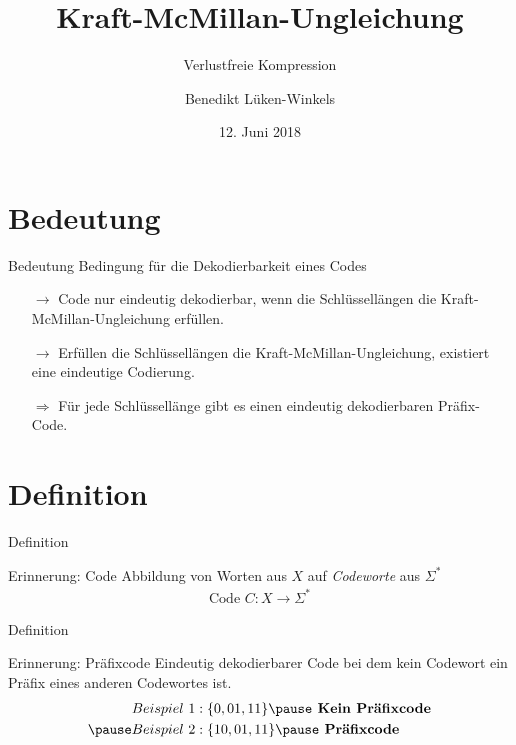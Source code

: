 \documentclass{beamer}
\title{Kraft-McMillan-Ungleichung}
\subtitle{Verlustfreie Kompression}
\date{12. Juni 2018}
\author{Benedikt L{\"u}ken-Winkels}
\institute{Universit{\"a}t Trier}
\begin{document}
\nocite{*}
\maketitle
\section{Bedeutung}
\begin{frame}{Bedeutung}
Bedingung für die Dekodierbarkeit eines Codes\pause
\begin{itemize}
\item[ $\rightarrow$] Code nur eindeutig dekodierbar, wenn die Schlüssellängen die Kraft-McMillan-Ungleichung erfüllen.\pause
\item[$\rightarrow$] Erfüllen die Schlüssellängen die Kraft-McMillan-Ungleichung, existiert eine eindeutige Codierung.\pause
\item[$\Rightarrow$] Für jede Schlüssellänge gibt es einen eindeutig dekodierbaren Präfix-Code.
\end{itemize}

\end{frame}

\section{Definition}
\begin{frame}{Definition}

\begin{center}
\begin{minipage}{.65\textwidth}
\begin{block}{Erinnerung: Code}
Abbildung von Worten aus $X$ auf \textit{Codeworte} aus $\Sigma^{*}$ \pause
\begin{align*}
\text{Code } C:X \rightarrow \Sigma^{*}
\end{align*}
\end{block}
\end{minipage}
\end{center}

\end{frame}

\begin{frame}{Definition}

\begin{center}
\begin{minipage}{.9\textwidth}
\begin{block}{Erinnerung: Präfixcode}
Eindeutig dekodierbarer Code bei dem kein Codewort ein Präfix eines anderen Codewortes ist.\pause
\begin{align*}
Beispiel\ 1&: \{0, 01, 11\} \pause \textbf{ Kein Präfixcode}\\ \pause
Beispiel\ 2&: \{10, 01, 11\} \pause \textbf{ Präfixcode}
\end{align*}
\end{block}
\end{minipage}
\end{center}

\end{frame}
\end{document}
